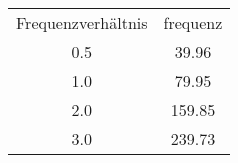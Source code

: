 \begin{table}
\begin{tabular}{cc}
Frequenzverhältnis & frequenz \\
0.5 & 39.96 \\
1.0 & 79.95 \\
2.0 & 159.85 \\
3.0 & 239.73 \\
\end{tabular}
\end{table}

